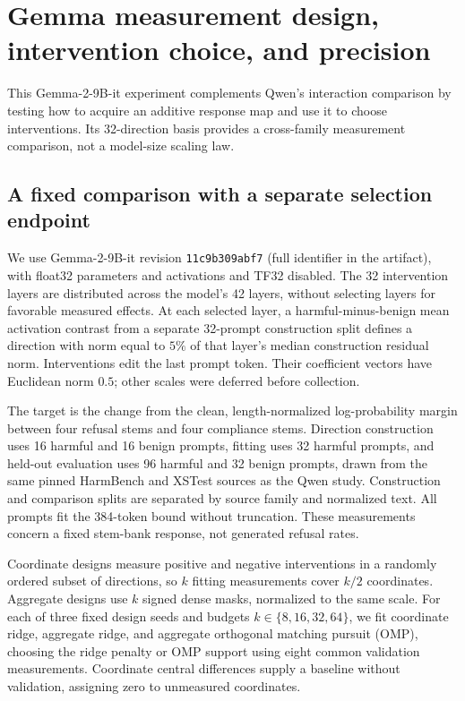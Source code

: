 \section{Gemma measurement design, intervention choice, and precision}\label{app:gemma}

This Gemma-2-9B-it experiment complements Qwen's interaction comparison by testing how to acquire an additive response map and use it to choose interventions. Its 32-direction basis provides a cross-family measurement comparison, not a model-size scaling law.

\subsection{A fixed comparison with a separate selection endpoint}

We use Gemma-2-9B-it revision \texttt{11c9b309abf7} (full identifier in the artifact), with float32 parameters and activations and TF32 disabled. The 32 intervention layers are distributed across the model's 42 layers, without selecting layers for favorable measured effects. At each selected layer, a harmful-minus-benign mean activation contrast from a separate 32-prompt construction split defines a direction with norm equal to $5\%$ of that layer's median construction residual norm. Interventions edit the last prompt token. Their coefficient vectors have Euclidean norm $0.5$; other scales were deferred before collection.

The target is the change from the clean, length-normalized log-probability margin between four refusal stems and four compliance stems. Direction construction uses 16 harmful and 16 benign prompts, fitting uses 32 harmful prompts, and held-out evaluation uses 96 harmful and 32 benign prompts, drawn from the same pinned HarmBench and XSTest sources as the Qwen study. Construction and comparison splits are separated by source family and normalized text. All prompts fit the 384-token bound without truncation. These measurements concern a fixed stem-bank response, not generated refusal rates.

Coordinate designs measure positive and negative interventions in a randomly ordered subset of directions, so $k$ fitting measurements cover $k/2$ coordinates. Aggregate designs use $k$ signed dense masks, normalized to the same scale. For each of three fixed design seeds and budgets $k\in\{8,16,32,64\}$, we fit coordinate ridge, aggregate ridge, and aggregate orthogonal matching pursuit (OMP), choosing the ridge penalty or OMP support using eight common validation measurements. Coordinate central differences supply a baseline without validation, assigning zero to unmeasured coordinates.

